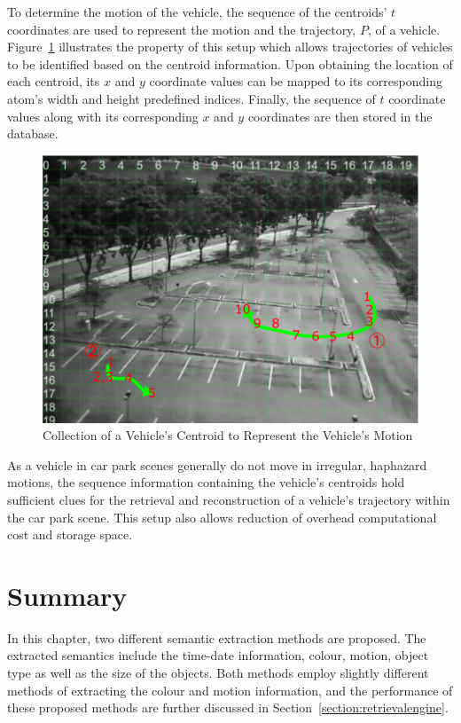 To determine the motion of the vehicle, the sequence of the centroids' $t$ coordinates are used to represent the motion and the trajectory, $P$, of a vehicle. Figure~\ref{fig:motionExample} illustrates the property of this setup which allows trajectories of vehicles to be identified based on the centroid information. Upon obtaining the location of each centroid, its $x$ and $y$ coordinate values can be mapped to its corresponding atom's width and height predefined indices. Finally, the sequence of $t$ coordinate values along with its corresponding $x$ and $y$ coordinates are then stored in the database.
\begin{figure}[hbt!]\centering
\includegraphics[width=.9\textwidth]{image/general/trajectorysample2.png}
\caption{Collection of a Vehicle's Centroid to Represent the Vehicle's Motion}
\label{fig:motionExample}
\end{figure}

As a vehicle in car park scenes generally do not move in irregular, haphazard motions, the sequence information containing the vehicle's centroids hold sufficient clues for the retrieval and reconstruction of a vehicle's trajectory within the car park scene. This setup also allows reduction of overhead computational cost and storage space. %

\section{Summary}
In this chapter, two different semantic extraction methods are proposed. The extracted semantics include the time-date information, colour, motion, object type as well as the size of the objects. Both methods employ slightly different methods of extracting the colour and motion information, and the performance of these proposed methods are further discussed in Section~\ref{section:retrievalengine}.

